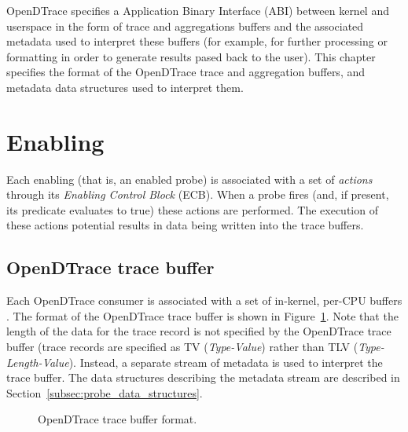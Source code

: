 OpenDTrace specifies a Application Binary Interface (ABI) between kernel and
userspace in the form of trace and aggregations buffers and the associated
metadata used to interpret these buffers (for example, for further processing
or formatting in order to generate results pased back to the user). This
chapter specifies the format of the OpenDTrace trace and aggregation buffers,
and metadata data structures used to interpret them.

\section{Enabling}
\label{sec:probes}

Each enabling (that is, an enabled probe) is associated with a set of
\textit{actions} through its \textit{Enabling Control Block} (ECB). When a
probe fires (and, if present, its predicate evaluates to true) these
actions are performed. The execution of these actions potential results in
data being written into the trace buffers.

\subsection{OpenDTrace trace buffer}
\label{subsec:trace_buffer}

Each OpenDTrace consumer is associated with a set of in-kernel, per-CPU buffers
\cite{DTrace2004}.  The format of the OpenDTrace trace buffer is shown in
Figure~\ref{fig:trace_buffer}.  Note that the length of the data for the trace
record is not specified by the OpenDTrace trace buffer (trace records are specified
as TV (\textit{Type-Value}) rather than TLV (\textit{Type-Length-Value}).
Instead, a separate stream of metadata is used to interpret the trace buffer.
The data structures describing the metadata stream are described in
Section~\ref{subsec:probe_data_structures}.

\begin{figure}[!ht]
	\centering
	\caption{OpenDTrace trace buffer format.}
	\label{fig:trace_buffer}
\end{figure}

